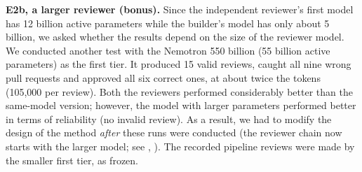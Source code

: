 \textbf{E2b, a larger reviewer (bonus).} Since the independent reviewer's first model has 12 billion active parameters while the builder's model has only about 5 billion, we asked whether the results depend on the size of the reviewer model. We conducted another test with the Nemotron 550 billion (55 billion active parameters) as the first tier. It produced 15 valid reviews, caught all nine wrong pull requests and approved all six correct ones, at about twice the tokens (105,000 per review). Both the reviewers performed considerably better than the same-model version; however, the model with larger parameters performed better in terms of reliability (no invalid review). As a result, we had to modify the design of the method \emph{after} these runs were conducted (the reviewer chain now starts with the larger model; see , ). The recorded pipeline reviews were made by the smaller first tier, as frozen.
